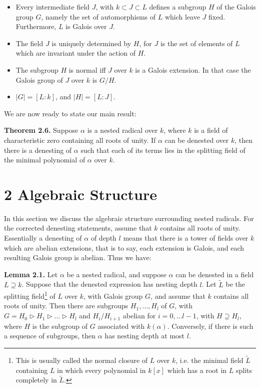 \documentclass[11pt,letterpaper]{article}
\begin{document}
\begin{itemize}
  \item[1.] Every intermediate field $J$, with $k \subset J \subset L$ defines a subgroup $H$ of the Galois group $G$, namely the set of automorphisms of $L$ which leave $J$ fixed. Furthermore, $L$ is Galois over $J$.
  \item[2.] The field $J$ is uniquely determined by $H$, for $J$ is the set of elements of $L$ which are invariant under the action of $H$.
  \item[3.] The subgroup $H$ is normal iff $J$ over $k$ is a Galois extension. In that case the Galois group of $J$ over $k$ is $G / H$.
  \item[4.] $|G|=[L: k]$, and $|H|=[L: J]$.
\end{itemize}

We are now ready to state our main result:

\noindent\textbf{Theorem 2.6.} Suppose $\alpha$ is a nested radical over $k$, where $k$ is a field of characteristic zero containing all roots of unity. If $\alpha$ can be denested over $k$, then there is a denesting of $\alpha$ such that each of its terms lies in the splitting field of the minimal polynomial of $\alpha$ over $k$.

\section*{2 Algebraic Structure}
In this section we discuss the algebraic structure surrounding nested radicals. For the corrected denesting statements, assume that $k$ contains all roots of unity. Essentially a denesting of $\alpha$ of depth $l$ means that there is a tower of fields over $k$ which are abelian extensions, that is to say, each extension is Galois, and each resulting Galois group is abelian. Thus we have:

\noindent\textbf{Lemma 2.1.} Let $\alpha$ be a nested radical, and suppose $\alpha$ can be denested in a field $L \supseteq k$. Suppose that the denested expression has nesting depth $l$. Let $\tilde{L}$ be the splitting field\footnote{This is usually called the normal closure of $L$ over $k$, i.e. the minimal field $\tilde{L}$ containing $L$ in which every polynomial in $k[x]$ which has a root in $L$ splits completely in $\tilde{L}$.} of $L$ over $k$, with Galois group $G$, and assume that $k$ contains all roots of unity. Then there are subgroups $H_{1}, \ldots, H_{l}$ of $G$, with $G=H_{0} \triangleright H_{1} \triangleright \ldots \triangleright H_{l}$ and $H_{i} / H_{i+1}$ abelian for $i=0, \ldots l-1$, with $H \supseteq H_{l}$, where $H$ is the subgroup of $G$ associated with $k(\alpha)$. Conversely, if there is such a sequence of subgroups, then $\alpha$ has nesting depth at most $l$.
\end{document}
